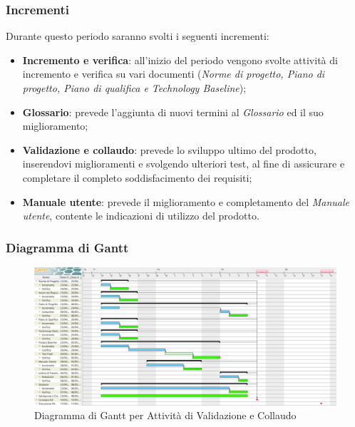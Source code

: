 \subsubsection{Incrementi}
Durante questo periodo saranno svolti i seguenti incrementi:
\begin{itemize}
	\item \textbf{Incremento e verifica}: all'inizio del periodo vengono svolte attività di incremento e verifica su vari documenti (\textit{Norme di progetto, Piano di progetto, Piano di qualifica e Technology Baseline});
	\item \textbf{Glossario}: prevede l'aggiunta di nuovi termini al \textit{Glossario} ed il suo miglioramento;
	\item \textbf{Validazione e collaudo}: prevede lo sviluppo ultimo del prodotto, inserendovi miglioramenti e svolgendo ulteriori test, al fine di assicurare e completare il completo soddisfacimento dei requisiti;
	\item \textbf{Manuale utente}: prevede il miglioramento e completamento del \textit{Manuale utente}, contente le indicazioni di utilizzo del prodotto.
\end{itemize}

\begin{landscape}
\subsubsection{Diagramma di Gantt}
\begin{figure}[H]
	\centering
  		\includegraphics[width=1.0\linewidth]{./images/ValidazioneeCollaudo.png}
  		\caption{Diagramma di Gantt per Attività di Validazione e Collaudo}
  		\label{fig:Gantt Validazione e Collaudo}
\end{figure}
\end{landscape}
